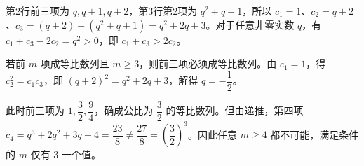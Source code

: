 \begin{answer}
第2行前三项为 $q,q+1,q+2$，第3行第2项为 $q^2+q+1$，所以 $c_1=1$、$c_2=q+2$、$c_3=(q+2)+(q^2+q+1)=q^2+2q+3$。对于任意非零实数 $q$，有 $c_1+c_3-2c_2=q^2>0$，即 $c_1+c_3>2c_2$。


若前 $m$ 项成等比数列且 $m\ge3$，则前三项必须成等比数列。由 $c_1=1$，得 $c_2^2=c_1c_3$，即 $(q+2)^2=q^2+2q+3$，解得 $q=-\dfrac12$。

此时前三项为 $1,\dfrac32,\dfrac94$，确成公比为 $\dfrac32$ 的等比数列。但由递推，第四项 $c_4=q^3+2q^2+3q+4=\dfrac{23}{8}\ne\dfrac{27}{8}=\left(\dfrac32\right)^3$。因此任意 $m\ge4$ 都不可能，满足条件的 $m$ 仅有 $3$ 一个值。




\end{answer}